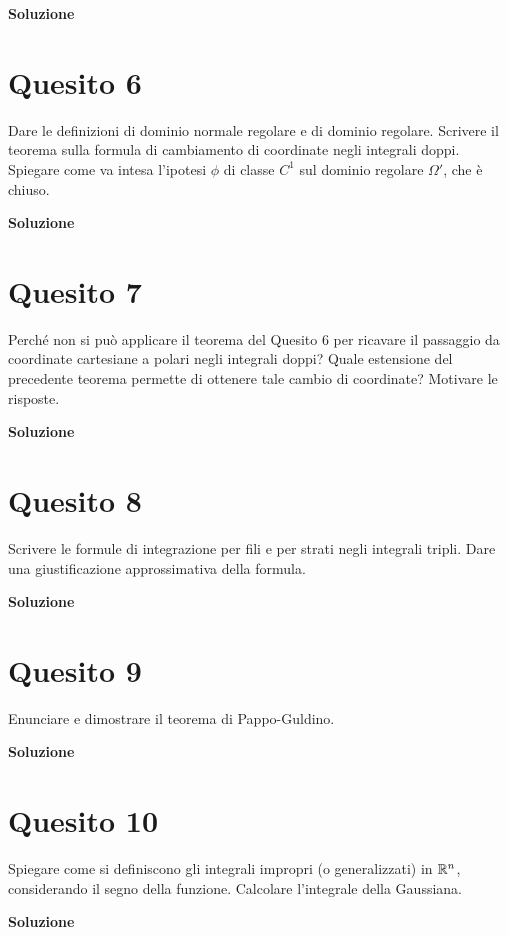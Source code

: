 \medskip
\begin{large}
\textbf{Soluzione}
\end{large}


\section*{Quesito 6}
Dare le definizioni di dominio normale regolare e di dominio regolare. Scrivere
il teorema sulla formula di cambiamento di coordinate negli integrali doppi. Spiegare come
va intesa l’ipotesi $\phi$ di classe $C^1$
sul dominio regolare $\Omega '$, che è chiuso.

\medskip
\begin{large}
\textbf{Soluzione}
\end{large}


\section*{Quesito 7}
Perché non si può applicare il teorema del Quesito 6 per ricavare il passaggio
da coordinate cartesiane a polari negli integrali doppi? Quale estensione del precedente
teorema permette di ottenere tale cambio di coordinate? Motivare le risposte.

\medskip
\begin{large}
\textbf{Soluzione}
\end{large}


\section*{Quesito 8}
Scrivere le formule di integrazione per fili e per strati negli integrali tripli.
Dare una giustificazione approssimativa della formula.

\medskip
\begin{large}
\textbf{Soluzione}
\end{large}


\section*{Quesito 9}
Enunciare e dimostrare il teorema di Pappo-Guldino.

\medskip
\begin{large}
\textbf{Soluzione}
\end{large}


\section*{Quesito 10}
Spiegare come si definiscono gli integrali impropri (o generalizzati) in $\mathbb{R}^n$,
considerando il segno della funzione. Calcolare l’integrale della Gaussiana.

\medskip
\begin{large}
\textbf{Soluzione}
\end{large}
